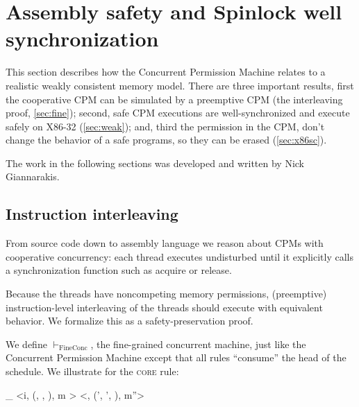 \section{Assembly safety and Spinlock well synchronization}
\label{sec:asm_proofs}

This section describes how the Concurrent Permission Machine relates to a realistic weakly consistent memory model. There are three important results, 
first the cooperative CPM can be simulated by a preemptive CPM (the interleaving proof, \autoref{sec:fine}); second, safe CPM executions are well-synchronized and execute safely on X86-32 (\autoref{sec:weak}); and, third the permission in the CPM, don't change the behavior of a safe programs, so they can be erased (\autoref{sec:x86sc}).

The work in the following sections was developed and written by Nick Giannarakis.




\subsection{Instruction interleaving}
\label{sec:fine}
From source code down to assembly language we
reason about CPMs with cooperative concurrency: each thread
executes undisturbed until it explicitly calls a
synchronization function such as acquire or release.

Because the threads have noncompeting memory permissions,
(preemptive) instruction-level interleaving of the threads should
execute with equivalent behavior.  We formalize this as a
safety-preservation proof.

\begin{definition}
  \label{def:fineconc}
We define $\vdash_\mathrm{FineConc}$, the fine-grained concurrent
machine, just like the Concurrent Permission Machine except that
all rules ``consume'' the head of the schedule.
We illustrate for the \textsc{core} rule:

\vspace{-2ex}
  {
\Psi \vdash_ 
\left<i\cdot\mho, (, \vec{\pi}, \lockpool), m \right>
\mapsto
\left<\mho, (', \vec{\pi}', \lockpool), m''\right>
  }
\end{definition}

